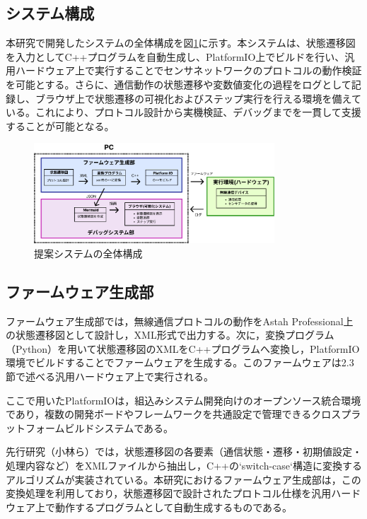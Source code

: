 \documentclass[technicalreport]{ieicej}
\begin{document}
\subsection{システム構成}
本研究で開発したシステムの全体構成を図\ref{fig:system-composition}に示す。本システムは、状態遷移図を入力としてC++プログラムを自動生成し、PlatformIO上でビルドを行い、汎用ハードウェア上で実行することでセンサネットワークのプロトコルの動作検証を可能とする。さらに、通信動作の状態遷移や変数値変化の過程をログとして記録し、ブラウザ上で状態遷移の可視化およびステップ実行を行える環境を備えている。これにより、プロトコル設計から実機検証、デバッグまでを一貫して支援することが可能となる。
\begin{figure}[h]
  \centering
  \includegraphics[width=90mm]{./images/system-composition.pdf}
  \caption{提案システムの全体構成}
  \label{fig:system-composition}
\end{figure}


\subsection{ファームウェア生成部}
ファームウェア生成部では，無線通信プロトコルの動作をAstah Professional上の状態遷移図として設計し，XML形式で出力する。次に，変換プログラム（Python）を用いて状態遷移図のXMLをC++プログラムへ変換し，PlatformIO環境でビルドすることでファームウェアを生成する。このファームウェアは2.3節で述べる汎用ハードウェア上で実行される。

ここで用いたPlatformIOは，組込みシステム開発向けのオープンソース統合環境であり，複数の開発ボードやフレームワークを共通設定で管理できるクロスプラットフォームビルドシステムである\cite{platformio}。

先行研究（小林ら\cite{kobayashi}）では，状態遷移図の各要素（通信状態・遷移・初期値設定・処理内容など）をXMLファイルから抽出し，C++の`switch-case`構造に変換するアルゴリズムが実装されている。本研究におけるファームウェア生成部は，この変換処理を利用しており，状態遷移図で設計されたプロトコル仕様を汎用ハードウェア上で動作するプログラムとして自動生成するものである。
\end{document}
